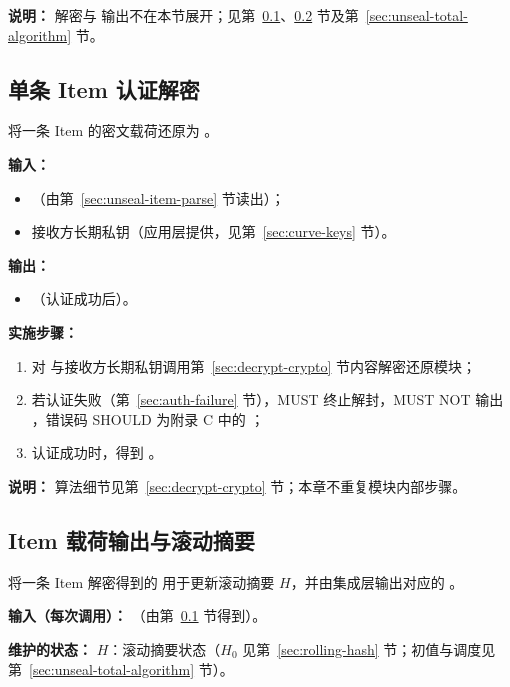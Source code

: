 \textbf{说明：}
解密与  输出不在本节展开；见第~\ref{sec:unseal-item-crypto}、\ref{sec:unseal-item-output} 节及第~\ref{sec:unseal-total-algorithm} 节。

\subsection{单条 Item 认证解密}\label{sec:unseal-item-crypto}
将一条 Item 的密文载荷还原为 。

\textbf{输入：}
\begin{itemize}
  \item {}（由第~\ref{sec:unseal-item-parse} 节读出）；
  \item 接收方长期私钥（应用层提供，见第~\ref{sec:curve-keys} 节）。
\end{itemize}

\textbf{输出：}
\begin{itemize}
  \item {}（认证成功后）。
\end{itemize}

\textbf{实施步骤：}
\begin{enumerate}
  \item 对  与接收方长期私钥调用第~\ref{sec:decrypt-crypto} 节内容解密还原模块；
  \item 若认证失败（第~\ref{sec:auth-failure} 节），MUST 终止解封，MUST NOT 输出 ，错误码 SHOULD 为附录 C 中的 ；
  \item 认证成功时，得到 。
\end{enumerate}

\textbf{说明：}
算法细节见第~\ref{sec:decrypt-crypto} 节；本章不重复模块内部步骤。

\subsection{Item 载荷输出与滚动摘要}\label{sec:unseal-item-output}\label{sec:unseal-rolling-hash}\label{sec:unseal-batch-output}
将一条 Item 解密得到的  用于更新滚动摘要 $H$，并由集成层输出对应的 。

\textbf{输入（每次调用）：}
（由第~\ref{sec:unseal-item-crypto} 节得到）。

\textbf{维护的状态：}
$H$：滚动摘要状态（$H_0$ 见第~\ref{sec:rolling-hash} 节；初值与调度见第~\ref{sec:unseal-total-algorithm} 节）。

